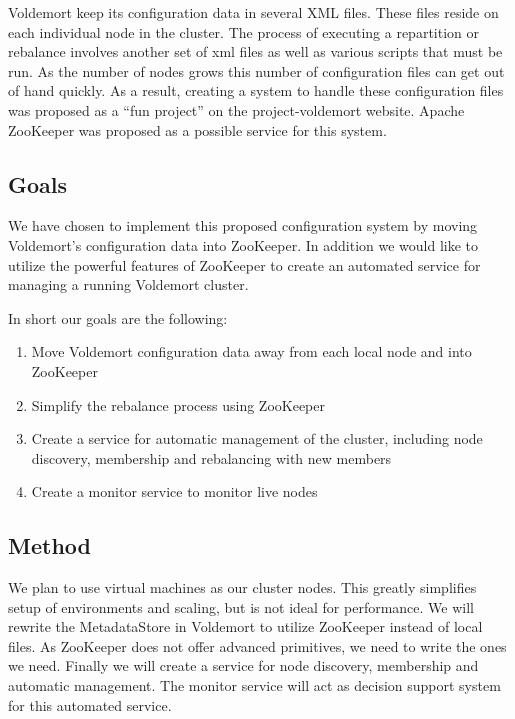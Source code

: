 Voldemort keep its configuration data in several XML files. These files reside on each individual node in the cluster. The process of executing a repartition or rebalance involves another set of xml files as well as various scripts that must be run. As the number of nodes grows this number of configuration files can get out of hand quickly. 
As a result, creating a system to handle these configuration files was proposed as a ``fun project'' on the project-voldemort website. Apache ZooKeeper was proposed as a possible service for this system.  


\subsection{Goals}
We have chosen to implement this proposed configuration system by moving Voldemort's configuration data into ZooKeeper. In addition we would like to utilize the powerful features of ZooKeeper to create an automated service for managing a running Voldemort cluster. 


In short our goals are the following:

\begin{enumerate}
	\item{Move Voldemort configuration data away from each local node and into ZooKeeper}
	\item{Simplify the rebalance process using ZooKeeper}
	\item{Create a service for automatic management of the cluster, including node discovery, membership and rebalancing with new members}
	\item{Create a monitor service to monitor live nodes}
\end{enumerate}

\subsection{Method}
We plan to use virtual machines as our cluster nodes. This greatly simplifies setup of environments and scaling, but is not ideal for performance. We will rewrite the MetadataStore in Voldemort to utilize ZooKeeper instead of local files. As ZooKeeper does not offer advanced primitives, we need to write the ones we need. Finally we will create a service for node discovery, membership and automatic management. The monitor service will act as decision support system for this automated service. 


